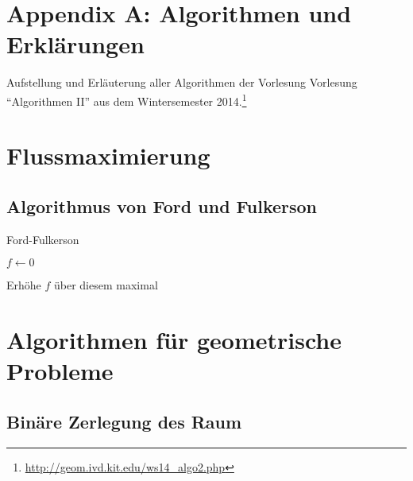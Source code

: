\section{Appendix A: Algorithmen und Erklärungen}

Aufstellung und Erläuterung aller Algorithmen der Vorlesung Vorlesung "`Algorithmen II"' aus dem Wintersemester 2014.\footnote{\url{http://geom.ivd.kit.edu/ws14_algo2.php}}

\section{Flussmaximierung}

\subsection{Algorithmus von Ford und Fulkerson}

\begin{algorithm}[H]
	\caption{Ford-Fulkerson}

	\BlankLine

	$f \longleftarrow 0$

	 {
		Erhöhe $f$ über diesem maximal
	}
\end{algorithm}


\section{Algorithmen für geometrische Probleme}

\subsection{Binäre Zerlegung des Raum}
